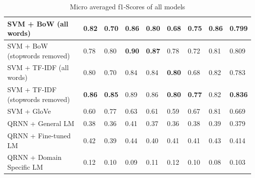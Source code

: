 \documentclass[a4paper,twoside,phd]{BYUPhys}
\begin{document}
\begin{table}[H]
{\begin{tabular}{|p{2.6cm}|p{1.6cm}|p{1.6cm}|p{1.6cm}|p{1.6cm}|p{1.6cm}|p{1.6cm}|p{1.6cm}|p{2.5cm}|}
		SVM + BoW (all words)   & 0.82  & 0.70 & 0.86 & 0.80 & 0.68  & 0.75 &  \textbf{0.86} & 0.799                                                                                                                                  \\
		\hline
		
		
		SVM + BoW (stopwords \newline removed)  &  0.78 &  0.80  &  \textbf{0.90} &   \textbf{0.87} & 0.78  &  0.72   &  0.81 & 0.809 \\
        \hline                                                                                                                                                                                                  
		
		SVM + \newline TF-IDF \newline (all words)   & 0.80 & 0.70 & 0.84 & 0.84 & \textbf{0.80}  & 0.68  &  0.82 & 0.783                                                                                                                                             \\
		\hline
		
		SVM + \newline TF-IDF \newline (stopwords \newline removed)  &   \textbf{0.86} &  \textbf{0.85} & 0.89  &  0.86  &   \textbf{0.80}  & \textbf{0.77}  & 0.82 & \textbf{0.836}  \\
		\hline

		
		SVM + GloVe  & 0.60 & 0.77 & 0.63 & 0.61 & 0.59  & 0.67 & 0.81 & 0.669                                                                                                                                           \\		   
		\hline
		
		QRNN + \newline General LM  & 0.38 & 0.36 & 0.41 & 0.37 & 0.36  & 0.38  & 0.39 & 0.379  \\
		\hline
		
		QRNN + \newline Fine-tuned LM  & 0.42 & 0.39 & 0.44 & 0.40 & 0.41 & 0.41  & 0.43 & 0.414   \\
		\hline
		
		QRNN + \newline Domain \newline Specific LM  & 0.12 & 0.10 & 0.09 & 0.11 & 0.12  & 0.10 & 0.08 & 0.103\\
		\hline                                                          
		                                                                                                                                                                  
	\end{tabular}}
	\caption{Micro averaged f1-Scores of all models}
	\label{table:AccuracyResults}
\end{table}
\end{document}
